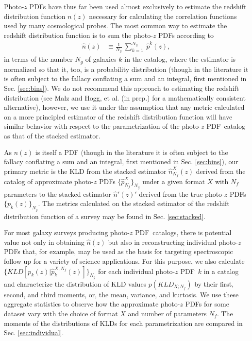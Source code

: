 \documentclass[\docopts]{\docclass}
\newcommand{\pz}{photo-$z$ PDF}
\newcommand{\Pz}{Photo-$z$ PDF}
\begin{document}
\Pz s have thus far been used almost exclusively to estimate the redshift 
distribution function $n(z)$ necessary for calculating the correlation 
functions used by many cosmological probes.  The most common way to estimate 
the redshift distribution function is to sum the \pz s according to
\begin{align}
  \label{eq:nz}
  \hat{n}(z) &\equiv \frac{1}{N_{g}}\ \sum_{k=1}^{N_{g}}\ \hat{p}^{k}(z),
\end{align}
in terms of the number $N_{g}$ of galaxies $k$ in the catalog, where the 
estimator is normalized so that it, too, is a probability distribution (though 
in the literature it is often subject to the fallacy conflating a sum and an 
integral, first mentioned in Sec. \ref{sec:bins}).  We do not recommend this 
approach to estimating the redshift distribution (see Malz and Hogg, et al. (in 
prep.) for a mathematically consistent alternative), however, we use it under 
the assumption that any metric calculated on a more principled estimator of the 
redshift distribution function will have similar behavior with respect to the 
parametrization of the \pz\ catalog as that of the stacked estimator.

As $n(z)$ is itself a PDF (though in the literature it is often subject to the 
fallacy conflating a sum and an integral, first mentioned in Sec. 
\ref{sec:bins}), our primary metric is the KLD from the stacked estimator 
$\hat{n}_{N_{f}}^{X}(z)$ derived from the catalog of approximate \pz s 
$\{\hat{p}^{X}_{N_{f}}\}_{N_{g}}$ under a given format $X$ with $N_{f}$ 
parameters to the stacked estimator $\hat{n}'(z)'$ derived from the true \pz s 
$\{p_{k}(z)\}_{N_{g}}$.  The metrics calculated on the stacked estimator of the 
redshift distribution function of a survey may be found in Sec. 
\ref{sec:stacked}.

For most galaxy surveys producing \pz\ catalogs, there is potential value not 
only in obtaining $\hat{n}(z)$ but also in reconstructing individual \pz s 
that, for example, may be used as the basis for targeting spectroscopic follow 
up for a variety of science applications.
For this purpose, we also calculate $\{KLD[p_{k}(z) | \hat{p}^{X; 
N_{f}}_{k}(z)]\}_{N_{g}}$ for each individual \pz\ $k$ in a catalog and 
characterize the distribution of KLD values $p(KLD_{X; N_{f}})$ by their first, 
second, and third moments, or, the mean, variance, and kurtosis.  We use these 
aggregate statistics to observe how the approximate \pz s for some dataset vary 
with the choice of format $X$ and number of parameters $N_{f}$.  The moments of 
the distributions of KLDs for each parametrization are compared in Sec. 
\ref{sec:individual}.
\end{document}
